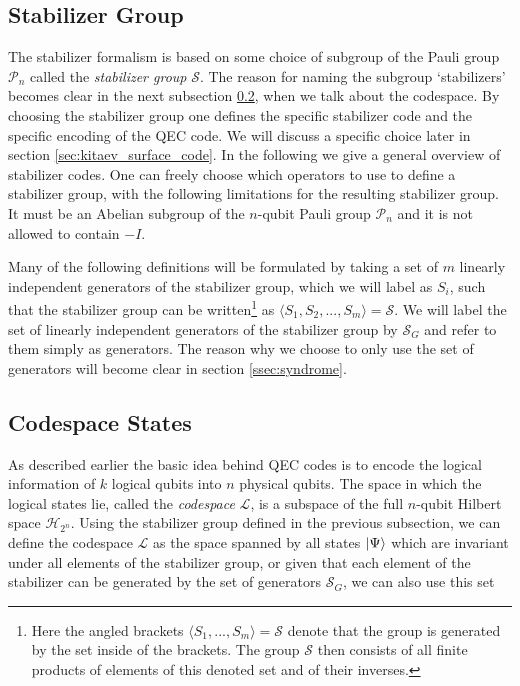 \subsection{Stabilizer Group}

The stabilizer formalism is based on some choice of subgroup of the Pauli group $\mathcal{P}_n$ called the \emph{stabilizer group} $\mathcal{S}$. 
The reason for naming the subgroup `stabilizers' becomes clear in the next subsection \ref{ssec:codespace}, when we talk about the codespace.
By choosing the stabilizer group one defines the specific stabilizer code and the specific encoding of the QEC code.
We will discuss a specific choice later in section \ref{sec:kitaev_surface_code}.
In the following we give a general overview of stabilizer codes. 
One can freely choose which operators to use to define a stabilizer group, with the following limitations for the resulting stabilizer group.
It must be an Abelian subgroup of the $n$-qubit Pauli group $\mathcal{P}_n$ and it is not allowed to contain $-I$. 

Many of the following definitions will be formulated by taking a set of $m$ linearly independent generators of the stabilizer group, which we will label as $S_i$, such that the stabilizer group can be written\footnote{
    Here the angled brackets $\langle S_1, ..., S_m \rangle= \mathcal{S}$ denote that the group is generated by the set inside of the brackets.
    The group $\mathcal{S}$ then consists of all finite products of elements of this denoted set and of their inverses. 
    } as $\langle S_1, S_2, ..., S_m\rangle= \mathcal{S}$.
We will label the set of linearly independent generators of the stabilizer group by $\mathcal{S}_G$ and refer to them simply as generators.
The reason why we choose to only use the set of generators will become clear in section \ref{ssec:syndrome}. 


\subsection{Codespace States}\label{ssec:codespace}

As described earlier the basic idea behind QEC codes is to encode the logical information of $k$ logical qubits into $n$ physical qubits.  
The space in which the logical states lie, called the \emph{codespace} $\mathcal{L}$, is a subspace of the full $n$-qubit Hilbert space $\mathcal{H}_{2^n}$. 
Using the stabilizer group defined in the previous subsection, we can define the codespace $\mathcal{L}$ as the space spanned by all states $\ket{\Psi}$ which are invariant under all elements of the stabilizer group,
or given that each element of the stabilizer can be generated by the set of generators $\mathcal{S}_G$, we can also use this set 


